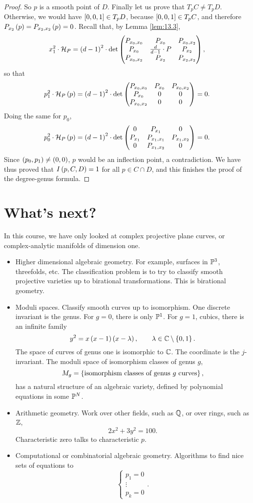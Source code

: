 \begin{proof}
So $ p $ is a smooth point of $ D $. Finally let us prove that $ T_pC \ne T_pD $. Otherwise, we would have $ \sbr{0, 0, 1} \in T_pD $, because $ \sbr{0, 0, 1} \in T_pC $, and therefore $ P_{x_2}\br{p} = P_{x_2, x_2}\br{p} = 0 $. Recall that, by Lemma \ref{lem:13.3},
$$ x_1^2 \cdot \HH_P = \br{d - 1}^2 \cdot \det\threebythree{P_{x_0, x_0}}{P_{x_0}}{P_{x_0, x_2}}{P_{x_0}}{\tfrac{d}{d - 1} \cdot P}{P_{x_2}}{P_{x_0, x_2}}{P_{x_2}}{P_{x_2, x_2}}, $$
so that
$$ p_1^2 \cdot \HH_P\br{p} = \br{d - 1}^2 \cdot \det\threebythree{P_{x_0, x_0}}{P_{x_0}}{P_{x_0, x_2}}{P_{x_0}}{0}{0}{P_{x_0, x_2}}{0}{0} = 0. $$
Doing the same for $ p_0 $,
$$ p_0^2 \cdot \HH_P\br{p} = \br{d - 1}^2 \cdot \det\threebythree{0}{P_{x_1}}{0}{P_{x_1}}{P_{x_1, x_1}}{P_{x_1, x_2}}{0}{P_{x_1, x_2}}{0} = 0. $$
Since $ \br{p_0, p_1} \ne \br{0, 0} $, $ p $ would be an inflection point, a contradiction. We have thus proved that $ I\br{p, C, D} = 1 $ for all $ p \in C \cap D $, and this finishes the proof of the degree-genus formula.
\end{proof}

\pagebreak

\section{What's next?}

In this course, we have only looked at complex projective plane curves, or complex-analytic manifolds of dimension one.
\begin{itemize}
\item Higher dimensional algebraic geometry. For example, surfaces in $ \P^3 $, threefolds, etc. The classification problem is to try to classify smooth projective varieties up to birational transformations. This is birational geometry.
\item Moduli spaces. Classify smooth curves up to isomorphism. One discrete invariant is the genus. For $ g = 0 $, there is only $ \P^1 $. For $ g = 1 $, cubics, there is an infinite family
$$ y^2 = x\br{x - 1}\br{x - \lambda}, \qquad \lambda \in \C \setminus \cbr{0, 1}. $$
The space of curves of genus one is isomorphic to $ \C $. The coordinate is the $ j $-invariant. The moduli space of isomorphism classes of genus $ g $,
$$ M_g = \cbr{\text{isomorphism classes of genus} \ g \ \text{curves}}, $$
has a natural structure of an algebraic variety, defined by polynomial equations in some $ \P^N $.
\item Arithmetic geometry. Work over other fields, such as $ \Q $, or over rings, such as $ \Z $,
$$ 2x^2 + 3y^2 = 100. $$
Characteristic zero talks to characteristic $ p $.
\item Computational or combinatorial algebraic geometry. Algorithms to find nice sets of equations to
$$
\begin{cases}
p_1 = 0 \\
\vdots \\
p_k = 0
\end{cases}.
$$
\end{itemize}

